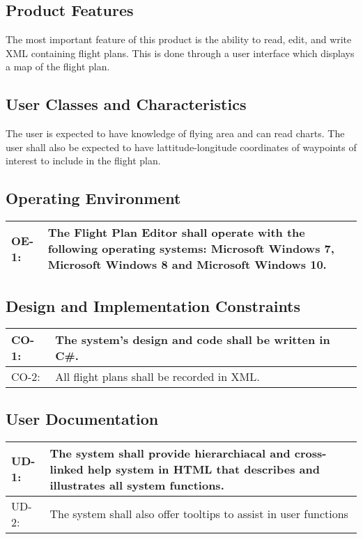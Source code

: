 \documentclass[12pt, letterpaper]{article}
\begin{document}
\subsection{Product Features}
The most important feature of this product is the ability to read, edit, and write XML containing flight plans.
This is done through a user interface which displays a map of the flight plan.

\subsection{User Classes and Characteristics}
The user is expected to have knowledge of flying area and can read charts.
The user shall also be expected to have lattitude-longitude coordinates of
waypoints of interest to include in the flight plan.

\subsection{Operating Environment}
\begin{tabularx}{\textwidth}{|l|X|} \hline
OE-1: & The Flight Plan Editor shall operate with the following operating systems:
    Microsoft Windows 7, Microsoft Windows 8 and Microsoft Windows 10. \\ \hline
\end{tabularx}

\subsection{Design and Implementation Constraints}
\begin{tabularx}{\textwidth}{|l|X|} \hline
CO-1: & The system's design and code shall be written in C\#. \\ \hline
CO-2: & All flight plans shall be recorded in XML. \\ \hline
\end{tabularx}

\subsection{User Documentation}
\begin{tabularx}{\textwidth}{|l|X|} \hline
UD-1: & The system shall provide hierarchiacal and cross-linked help system in HTML that describes and illustrates all system functions.\\ \hline
UD-2: & The system shall also offer tooltips to assist in user functions \\ \hline
\end{tabularx}
\end{document}
